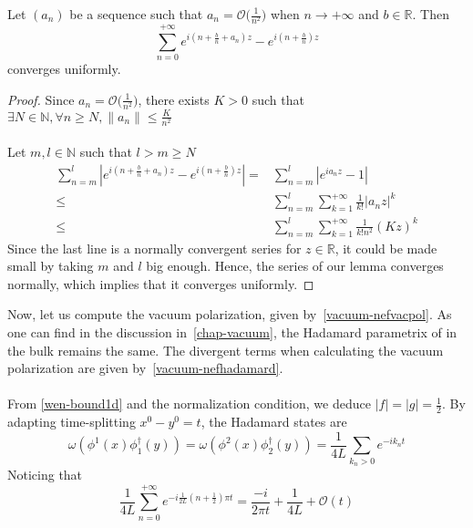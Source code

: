 %
\begin{lemma}
Let $(a_n)$ be a sequence such that $a_n = \mathcal{O}\big(\frac{1}{n^2})$ when $n\rightarrow+\infty$ and $b\in\mathbb{R}$. Then
\begin{equation*}
\sum_{n=0}^{+\infty} e^{i(n+\frac{b}{n}+a_n)z } - e^{i(n+\frac{b}{n})z }
\end{equation*}
converges uniformly.
\end{lemma}
\begin{proof}
Since $a_n = \mathcal{O}\big(\frac{1}{n^2}\big)$, 
there exists $ K > 0$ such that $ \exists N \in\mathbb{N}, \forall n\geq N, \| a_n\| \leq \frac{K}{n^2}$ \\\\
Let $m,l\in\mathbb{N}$ such that $l > m \geq N$
\begin{equation*}
\begin{split}
\sum_{n=m}^{l}  | e^{i(n+\frac{b}{n}+a_n)z } - e^{i(n+\frac{b}{n})z } | = & 
\sum_{n=m}^{l} | e^{ia_n z} - 1 | \\
%
\leq & \sum_{n=m}^{l}\sum_{k=1}^{+\infty}\frac{1}{k!}| a_n z |^k \\
%
\leq & \sum_{n=m}^l \sum_{k=1}^{+\infty}\frac{1}{k!n^2}(Kz)^k
\end{split}
\end{equation*}
Since the last line is a normally convergent series for $z \in \mathbb{R}$, it could be made small by taking $m$ and $l$ big enough.
Hence, the series of our lemma converges normally, which implies that it converges uniformly.
\end{proof}
Now, let us compute the vacuum polarization, given by~\cref{vacuum-nefvacpol}.
As one can find in the discussion in~\cref{chap-vacuum}, the Hadamard parametrix of in the bulk remains the same. 
The divergent terms when calculating the vacuum polarization are given by~\cref{vacuum-nefhadamard}. \\\\
From \cref{wen-bound1d} and the normalization condition, we deduce $|f| = |g| = \frac 1 2$.
By adapting time-splitting $x^0 - y^0 = t$, the Hadamard states are
\begin{equation*}
\omega(\phi^1(x)\phi^\dagger_1(y)) = \omega(\phi^2(x)\phi^\dagger_2(y)) = 
\frac{1}{4L}\sum_{k_n>0} e^{-ik_nt}
\end{equation*} 
Noticing that 
\begin{equation*}
\frac{ 1}{ 4L}\sum_{n=0}^{+\infty} e^{-i\frac{1}{2L}(n+\frac 1 2 ) \pi t} 
= \frac{-i}{2\pi t} + \frac{1}{4L} + \mathcal{O}(t)
\end{equation*}
